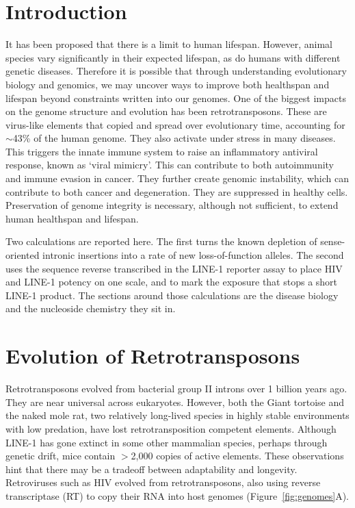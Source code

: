 \documentclass[11pt,twocolumn,twoside]{extarticle}
\begin{document}
\section{Introduction}
It has been proposed that there is a limit to human lifespan\cite{dong}. However, animal species vary significantly in their expected lifespan, as do humans with different genetic diseases. Therefore it is possible that through understanding evolutionary biology and genomics, we may uncover ways to improve both healthspan and lifespan beyond constraints written into our genomes. One of the biggest impacts on the genome structure and evolution has been retrotransposons. These are virus-like elements that copied and spread over evolutionary time, accounting for $\sim$43\% of the human genome. They also activate under stress in many diseases. This triggers the innate immune system to raise an inflammatory antiviral response, known as `viral mimicry'\cite{cecco}. This can contribute to both autoimmunity and immune evasion in cancer. They further create genomic instability, which can contribute to both cancer and degeneration\cite{rodriguez,gasior}. They are suppressed in healthy cells. Preservation of genome integrity is necessary, although not sufficient, to extend human healthspan and lifespan.

Two calculations are reported here. The first turns the known depletion of sense-oriented intronic insertions into a rate of new loss-of-function alleles. The second uses the sequence reverse transcribed in the LINE-1 reporter assay to place HIV and LINE-1 potency on one scale, and to mark the exposure that stops a short LINE-1 product. The sections around those calculations are the disease biology and the nucleoside chemistry they sit in.

\section{Evolution of Retrotransposons}
Retrotransposons evolved from bacterial group II introns over 1 billion years ago. They are near universal across eukaryotes. However, both the Giant tortoise and the naked mole rat, two relatively long-lived species in highly stable environments with low predation, have lost retrotransposition competent elements\cite{ivancevic}. Although LINE-1 has gone extinct in some other mammalian species\cite{ivancevic}, perhaps through genetic drift, mice contain $>$2,000 copies of active elements\cite{goodier2001}. These observations hint that there may be a tradeoff between adaptability and longevity. Retroviruses such as HIV evolved from retrotransposons, also using reverse transcriptase (RT) to copy their RNA into host genomes (Figure~\ref{fig:genomes}A).
\end{document}
